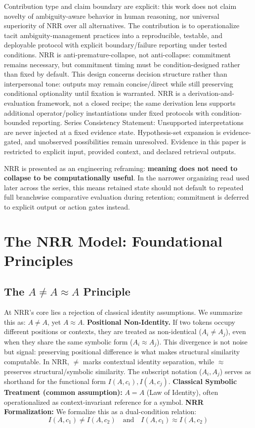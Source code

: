 \documentclass[11pt,a4paper]{article}
\newcommand{\AneqAapproxA}{A \neq A \approx A}
\begin{document}
Contribution type and claim boundary are explicit: this work does not claim novelty of ambiguity-aware behavior in human reasoning, nor universal superiority of NRR over all alternatives. The contribution is to operationalize tacit ambiguity-management practices into a reproducible, testable, and deployable protocol with explicit boundary/failure reporting under tested conditions.
NRR is anti-premature-collapse, not anti-collapse: commitment remains necessary, but commitment timing must be condition-designed rather than fixed by default.
This design concerns decision structure rather than interpersonal tone: outputs may remain concise/direct while still preserving conditional optionality until fixation is warranted.
NRR is a derivation-and-evaluation framework, not a closed recipe; the same derivation lens supports additional operator/policy instantiations under fixed protocols with condition-bounded reporting.
Series Consistency Statement: Unsupported interpretations are never injected at a fixed evidence state. Hypothesis-set expansion is evidence-gated, and unobserved possibilities remain unresolved. Evidence in this paper is restricted to explicit input, provided context, and declared retrieval outputs.

NRR is presented as an engineering reframing: \textbf{meaning does not need to collapse to be computationally useful}. In the narrower organizing read used later across the series, this means retained state should not default to repeated full branchwise comparative evaluation during retention; commitment is deferred to explicit output or action gates instead.

\section{The NRR Model: Foundational Principles}

\subsection{The $\AneqAapproxA$ Principle}

At NRR's core lies a rejection of classical identity assumptions.
We summarize this as: $A \neq A$, yet $A \approx A$.
\textbf{Positional Non-Identity.}
If two tokens occupy different positions or contexts, they are treated as non-identical
($A_i \neq A_j$), even when they share the same symbolic form ($A_i \approx A_j$).
This divergence is not noise but signal: preserving positional difference is what makes structural similarity computable.
In NRR, $\neq$ marks contextual identity separation, while $\approx$ preserves structural/symbolic similarity.
The subscript notation ($A_i, A_j$) serves as shorthand for the functional form $I(A, c_i), I(A, c_j)$.
\textbf{Classical Symbolic Treatment (common assumption):} $A = A$ (Law of Identity), often operationalized as context-invariant reference for a symbol.
\textbf{NRR Formalization:}
We formalize this as a dual-condition relation:
\begin{equation}
I(A, c_1) \neq I(A, c_2) \quad \text{and} \quad I(A, c_1) \approx I(A, c_2)
\end{equation}
\end{document}
